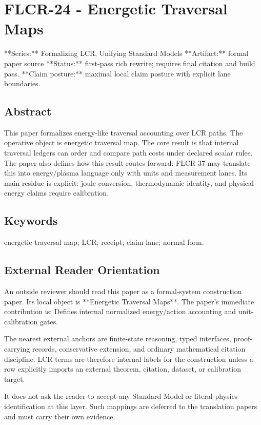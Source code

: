\documentclass[11pt]{article}
\begin{document}
\section*{FLCR-24 - Energetic Traversal Maps}

**Series:** Formalizing LCR, Unifying Standard Models
**Artifact:** formal paper source
**Status:** first-pass rich rewrite; requires final citation and build pass.
**Claim posture:** maximal local claim posture with explicit lane boundaries.

\subsection*{Abstract}

This paper formalizes energy-like traversal accounting over LCR paths. The operative object is energetic traversal map. The core result is that internal traversal ledgers can order and compare path costs under declared scalar rules. The paper also defines how this result routes forward: FLCR-37 may translate this into energy/plasma language only with units and measurement lanes. Its main residue is explicit: joule conversion, thermodynamic identity, and physical energy claims require calibration.

\subsection*{Keywords}

energetic traversal map; LCR; receipt; claim lane; normal form.

\subsection*{External Reader Orientation}

An outside reviewer should read this paper as a formal-system construction paper. Its local object is **Energetic Traversal Maps**. The paper's immediate contribution is: Defines internal normalized energy/action accounting and unit-calibration gates.

The nearest external anchors are finite-state reasoning, typed interfaces, proof-carrying records, conservative extension, and ordinary mathematical citation discipline. LCR terms are therefore internal labels for the construction unless a row explicitly imports an external theorem, citation, dataset, or calibration target.

It does not ask the reader to accept any Standard Model or literal-physics identification at this layer. Such mappings are deferred to the translation papers and must carry their own evidence.
\end{document}
